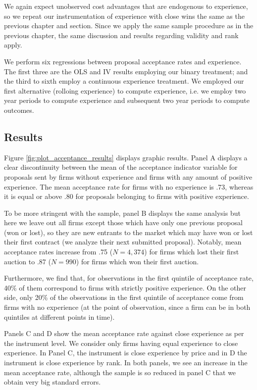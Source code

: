We again expect  unobserved cost advantages that are endogenous to experience, so we repeat our instrumentation of experience with close wins the same as the previous chapter and section. Since we apply the same sample procedure as in the previous chapter, the same discussion and results regarding validity and rank apply.

We perform six regressions between proposal acceptance rates and experience. The first three are the OLS and IV results employing our binary treatment; and the third to sixth employ a continuous experience treatment. We employed our first alternative (rolloing experience) to compute experience, i.e. we employ two year periods to compute experience and subsequent two year periods to compute outcomes.

\subsection{Results}
Figure \ref{fig:plot_acceptance_results} displays graphic results. Panel A displays a clear discontinuity between the mean of the acceptance indicator variable for proposals sent by firms without experience and firms with any amount of positive experience. The mean acceptance rate for firms with no experience is .73, whereas it is equal or above .80 for proposals belonging to firms with positive experience.

To be more stringent with the sample, panel B displays the same analysis but here we leave out all firms except those which have only one previous proposal (won or lost), so they are new entrants to the market which may have won or lost their first contract (we analyze their next submitted proposal).  Notably, mean acceptance rates increase from .75 ($N=4,374$) for firms which lost their first auction to .87 ($N=990$) for firms which won their first auction.

Furthermore, we find that, for observations in the first quintile of acceptance rate, 40\% of them correspond to firms with strictly positive experience. On the other side, only 20\% of the observations in the first quintile of acceptance come from firms with no experience (at the point of observation, since a firm can be in both quintiles at different points in time).

Panels C and D show the mean acceptance rate against close experience as per the instrument level. We consider only firms having equal experience to close experience. In Panel C, the instrument is close experience by price and in D the instrument is close experience by rank. In both panels, we see an increase in the mean acceptance rate, although the sample is so reduced in panel C that we obtain very big standard errors.

